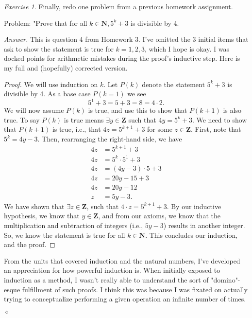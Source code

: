 \documentclass[12pt,oneside]{amsart}
\theoremstyle{remark}
\newtheorem{exer}{Exercise}
\newcommand{\bfN}{\mathbf{N}}
\newcommand{\bfZ}{\mathbf{Z}}
\newenvironment{answer}{\noindent\emph{Answer.}}{\hfill$\diamond$\newline}
\begin{document}
\newpage
\begin{exer}
Finally, redo one problem from a previous homework assignment. %

Problem: "Prove that for all $k \in \bfN, 5^k + 3$ is divisible by 4.
\end{exer}

\begin{answer}
This is question 4 from Homework 3. I've omitted the 3 initial items that ask to show the statement is true for $k = 1, 2, 3$, which I hope is okay. I was docked points for arithmetic mistakes during the proof's inductive step. Here is my full and (hopefully) corrected version.

\begin{proof}
We will use induction on $k$. Let $P(k)$ denote the statement $5^k + 3$ is divisible by 4. As a base case $P(k = 1)$ we see \[ 5^1 + 3 = 5 + 3 = 8 = 4 \cdot 2. \] We will now assume $P(k)$ is true, and use this to show that $P(k + 1)$ is also true. To say $P(k)$ is true means $\exists y \in \bfZ$ such that $4y = 5^k + 3$. We need to show that $P(k + 1)$ is true, i.e., that $4z = 5^{k + 1} + 3$ for some $z \in \bfZ$. First, note that $5^k = 4y - 3$. Then, rearranging the right-hand side, we have
\begin{align*}
4z &= 5^{k + 1} + 3 \\
4z &= 5^k \cdot 5^1 + 3 \\
4z &= (4y - 3) \cdot 5 + 3 \\
4z &= 20y - 15 + 3 \\
4z &= 20y - 12 \\
 z &= 5y - 3.
\end{align*}
We have shown that $\exists z \in \bfZ$, such that $4 \cdot z = 5^{k + 1} + 3$. By our inductive hypothesis, we know that $y \in \bfZ$, and from our axioms, we know that the multiplication and subtraction of integers (i.e., $5y - 3$) results in another integer. So, we know the statement is true for all $k \in \bfN$. This concludes our induction, and the proof.
\end{proof}


From the units that covered induction and the natural numbers, I've developed an appreciation for how powerful induction is. When initially exposed to induction as a method, I wasn't really able to understand the sort of "domino"-esque fulfillment of such proofs. I think this was because I was fixated on actually trying to conceptualize performing a given operation an infinite number of times.


\end{answer}
\end{document}
